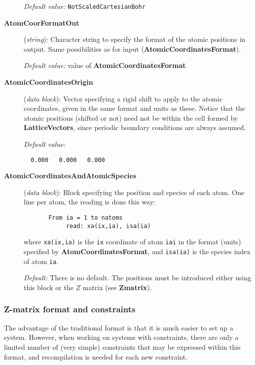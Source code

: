 \begin{description}
\textit{Default value:} \texttt{NotScaledCartesianBohr}


\item[\textbf{AtomCoorFormatOut}] (\textit{string}):
Character string to specify the format of the atomic positions in output.
Same possibilities as for input (\textbf{AtomicCoordinatesFormat}).

\textit{Default value:} value of \textbf{AtomicCoordinatesFormat}


\item[\textbf{AtomicCoordinatesOrigin}] (\textit{data block}):
Vector specifying a rigid shift to apply to the atomic coordinates,
given in the same format and units as these. Notice that the atomic
positions (shifted or not) need not be within the cell formed by
\textbf{LatticeVectors}, since periodic boundary conditions are always
assumed.

\textit{Default value:}
\begin{verbatim}
  0.000   0.000   0.000
\end{verbatim}

\item[\textbf{AtomicCoordinatesAndAtomicSpecies}] (\textit{data block}):
Block specifying the position and species of each atom.
One line per atom, the reading is done this way:
\begin{verbatim}
       From ia = 1 to natoms
            read: xa(ix,ia), isa(ia)
\end{verbatim}
where \texttt{xa(ix,ia)} is the \texttt{ix} coordinate of atom
\texttt{iai} in the format (units) specified by
\textbf{AtomCoordinatesFormat}, and \texttt{isa(ia)} is the species
index of atom \texttt{ia}.

\textit{Default:} There is no default. The positions must be introduced
either using this block or the $Z$ matrix (see \textbf{Zmatrix}).

\end{description}
\subsubsection{Z-matrix format and constraints}
\label{sec:Zmatrix}

The advantage of the traditional format is that it is
much easier to set up a system. However, when working
on systems with constraints, there are only a limited
number of (very simple) constraints that may be expressed
within this format, and recompilation is needed for each
new constraint.

